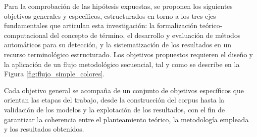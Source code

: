 \begin{enumerate}
\end{enumerate}

Para la comprobación de las hipótesis expuestas, se proponen los siguientes objetivos generales y específicos, estructurados en torno a los tres ejes fundamentales que articulan esta investigación: la formalización teórico-computacional del concepto de término, el desarrollo y evaluación de métodos automáticos para su detección, y la sistematización de los resultados en un recurso terminológico estructurado. Los objetivos propuestos requieren el diseño y la aplicación de un flujo metodológico secuencial, tal y como se describe en la Figura \ref{fig:flujo_simple_colores}.

Cada objetivo general se acompaña de un conjunto de objetivos específicos que orientan las etapas del trabajo, desde la construcción del corpus hasta la validación de los modelos y la explotación de los resultados, con el fin de garantizar la coherencia entre el planteamiento teórico, la metodología empleada y los resultados obtenidos.

